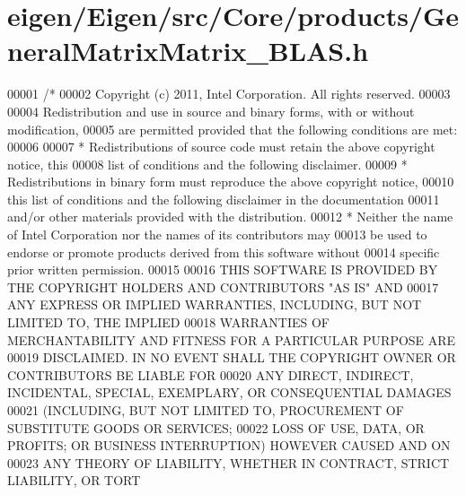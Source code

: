 \hypertarget{eigen_2_eigen_2src_2_core_2products_2_general_matrix_matrix___b_l_a_s_8h_source}{}\section{eigen/\+Eigen/src/\+Core/products/\+General\+Matrix\+Matrix\+\_\+\+B\+L\+AS.h}
\label{eigen_2_eigen_2src_2_core_2products_2_general_matrix_matrix___b_l_a_s_8h_source}

\begin{DoxyCode}
00001 \textcolor{comment}{/*}
00002 \textcolor{comment}{ Copyright (c) 2011, Intel Corporation. All rights reserved.}
00003 \textcolor{comment}{}
00004 \textcolor{comment}{ Redistribution and use in source and binary forms, with or without modification,}
00005 \textcolor{comment}{ are permitted provided that the following conditions are met:}
00006 \textcolor{comment}{}
00007 \textcolor{comment}{ * Redistributions of source code must retain the above copyright notice, this}
00008 \textcolor{comment}{   list of conditions and the following disclaimer.}
00009 \textcolor{comment}{ * Redistributions in binary form must reproduce the above copyright notice,}
00010 \textcolor{comment}{   this list of conditions and the following disclaimer in the documentation}
00011 \textcolor{comment}{   and/or other materials provided with the distribution.}
00012 \textcolor{comment}{ * Neither the name of Intel Corporation nor the names of its contributors may}
00013 \textcolor{comment}{   be used to endorse or promote products derived from this software without}
00014 \textcolor{comment}{   specific prior written permission.}
00015 \textcolor{comment}{}
00016 \textcolor{comment}{ THIS SOFTWARE IS PROVIDED BY THE COPYRIGHT HOLDERS AND CONTRIBUTORS "AS IS" AND}
00017 \textcolor{comment}{ ANY EXPRESS OR IMPLIED WARRANTIES, INCLUDING, BUT NOT LIMITED TO, THE IMPLIED}
00018 \textcolor{comment}{ WARRANTIES OF MERCHANTABILITY AND FITNESS FOR A PARTICULAR PURPOSE ARE}
00019 \textcolor{comment}{ DISCLAIMED. IN NO EVENT SHALL THE COPYRIGHT OWNER OR CONTRIBUTORS BE LIABLE FOR}
00020 \textcolor{comment}{ ANY DIRECT, INDIRECT, INCIDENTAL, SPECIAL, EXEMPLARY, OR CONSEQUENTIAL DAMAGES}
00021 \textcolor{comment}{ (INCLUDING, BUT NOT LIMITED TO, PROCUREMENT OF SUBSTITUTE GOODS OR SERVICES;}
00022 \textcolor{comment}{ LOSS OF USE, DATA, OR PROFITS; OR BUSINESS INTERRUPTION) HOWEVER CAUSED AND ON}
00023 \textcolor{comment}{ ANY THEORY OF LIABILITY, WHETHER IN CONTRACT, STRICT LIABILITY, OR TORT}

\end{DoxyCode}
